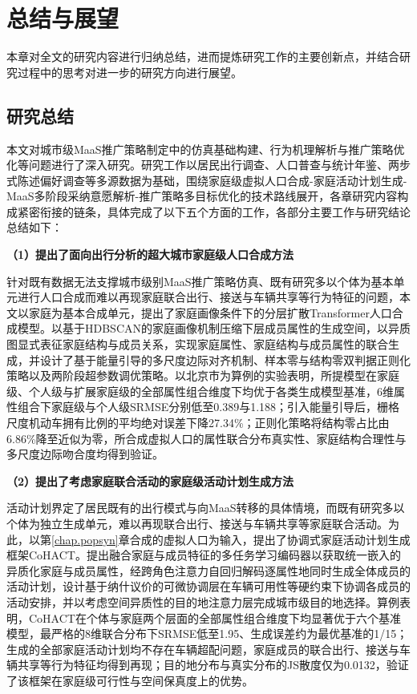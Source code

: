  \setlength{\baselineskip}{20pt}

\chapter{总结与展望}\label{chap.conclusion}

本章对全文的研究内容进行归纳总结，进而提炼研究工作的主要创新点，并结合研究过程中的思考对进一步的研究方向进行展望。

\section{研究总结}\label{sec.conclusion.summary}

本文对城市级MaaS推广策略制定中的仿真基础构建、行为机理解析与推广策略优化等问题进行了深入研究。研究工作以居民出行调查、人口普查与统计年鉴、两步式陈述偏好调查等多源数据为基础，围绕家庭级虚拟人口合成-家庭活动计划生成-MaaS多阶段采纳意愿解析-推广策略多目标优化的技术路线展开，各章研究内容构成紧密衔接的链条，具体完成了以下五个方面的工作，各部分主要工作与研究结论总结如下：

\textbf{（1）提出了面向出行分析的超大城市家庭级人口合成方法}

针对既有数据无法支撑城市级别MaaS推广策略仿真、既有研究多以个体为基本单元进行人口合成而难以再现家庭联合出行、接送与车辆共享等行为特征的问题，本文以家庭为基本合成单元，提出了家庭画像条件下的分层扩散Transformer人口合成模型。以基于HDBSCAN的家庭画像机制压缩下层成员属性的生成空间，以异质图显式表征家庭结构与成员关系，实现家庭属性、家庭结构与成员属性的联合生成，并设计了基于能量引导的多尺度边际对齐机制、样本零与结构零双判据正则化策略以及两阶段超参数调优策略。以北京市为算例的实验表明，所提模型在家庭级、个人级与扩展家庭级的全部属性组合维度下均优于各类生成模型基准，6维属性组合下家庭级与个人级SRMSE分别低至0.389与1.188；引入能量引导后，栅格尺度机动车拥有比例的平均绝对误差下降27.34\%；正则化策略将结构零占比由6.86\%降至近似为零，所合成虚拟人口的属性联合分布真实性、家庭结构合理性与多尺度边际吻合度均得到验证。

\textbf{（2）提出了考虑家庭联合活动的家庭级活动计划生成方法}

活动计划界定了居民既有的出行模式与向MaaS转移的具体情境，而既有研究多以个体为独立生成单元，难以再现联合出行、接送与车辆共享等家庭联合活动。为此，以第\ref{chap.popsyn}章合成的虚拟人口为输入，提出了协调式家庭活动计划生成框架CoHACT。提出融合家庭与成员特征的多任务学习编码器以获取统一嵌入的异质化家庭与成员属性，经跨角色注意力自回归解码逐属性地同时生成全体成员的活动计划，设计基于纳什议价的可微协调层在车辆可用性等硬约束下协调各成员的活动安排，并以考虑空间异质性的目的地注意力层完成城市级目的地选择。算例表明，CoHACT在个体与家庭两个层面的全部属性组合维度下均显著优于六个基准模型，最严格的8维联合分布下SRMSE低至1.95、生成误差约为最优基准的1/15；生成的全部家庭活动计划均不存在车辆超配问题，家庭成员的联合出行、接送与车辆共享等行为特征均得到再现；目的地分布与真实分布的JS散度仅为0.0132，验证了该框架在家庭级可行性与空间保真度上的优势。

